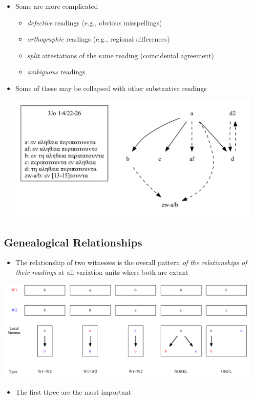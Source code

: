 \documentclass[10pt]{beamer}
\begin{document}
	\begin{frame}
		\begin{itemize}
			\item Some are more complicated
			\begin{itemize}
				\item \emph{defective} readings (e.g., obvious misspellings)
				\item \emph{orthographic} readings (e.g., regional differences)
				\item \emph{split} attestations of the same reading (coincidental agreement)
				\item \emph{ambiguous} readings
			\end{itemize}
			\item Some of these may be collapsed with other substantive readings
			\begin{center}
				\includegraphics[scale=0.5]{../img/B25K1V4U22-26-local-stemma-ignore-defective-ignore-ambiguous-merge-splits.pdf}
			\end{center}
		\end{itemize}
	\end{frame}
	\subsection{Genealogical Relationships}
	\begin{frame}
		\begin{itemize}
			\item The relationship of two witnesses is the overall pattern \emph{of the relationships of their readings} at all variation units where both are extant
		\end{itemize}
		\begin{center}
			\includegraphics[width=\textwidth]{../img/genealogical-relationships.pdf}
		\end{center}
		\begin{itemize}
			\item The first three are the most important
		\end{itemize}
	\end{frame}
\end{document}

